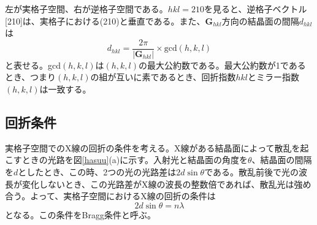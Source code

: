 \documentclass[11pt,a4j,uplatex]{jsarticle}
\begin{document}
\newpage
左が実格子空間、右が逆格子空間である。$hkl=210$を見ると、逆格子ベクトル[210]は、実格子における(210)と垂直である。また、$\bm{G}_{hkl}$方向の結晶面の間隔$d_{hkl}$は
\begin{equation}
  d_{hkl}=\frac{2\pi}{|\bm{G}_{hkl}|}\times \mathrm{gcd}(h,k,l)
\end{equation}
と表せる。gcd$(h,k,l)$は$(h,k,l)$の最大公約数である。最大公約数が1であるとき、つまり$(h,k,l)$の組が互いに素であるとき、回折指数$hkl$とミラー指数$(h,k,l)$は一致する。



\newpage
\subsection{回折条件}
実格子空間でのX線の回折の条件を考える。X線がある結晶面によって散乱を起こすときの光路を図\ref{hasuu}(a)に示す。入射光と結晶面の角度を$\theta$、結晶面の間隔を$d$としたとき、この時、2つの光の光路差は$2d\sin\theta$である。散乱前後で光の波長が変化しないとき、この光路差がX線の波長の整数倍であれば、散乱光は強め合う。よって、実格子空間におけるX線の回折の条件は
\begin{equation}
 2d\sin\theta=n\lambda
 \label{bragg}
\end{equation}
となる。この条件をBragg条件と呼ぶ。
\end{document}
